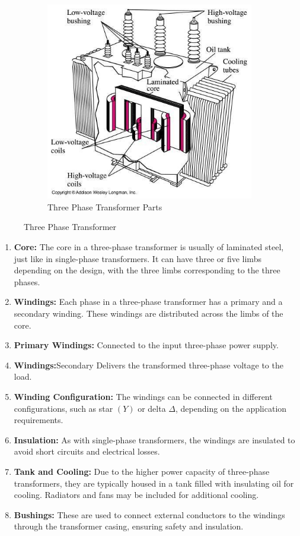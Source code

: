 \documentclass[a4paper,12pt]{article}
\begin{document}
\begin{figure}[h]
\begin{subfigure}[t]{0.49\textwidth}
			\includegraphics[width=1\textwidth, height=0.25\textheight]{Images/T3.2}
			\caption{Three Phase Transformer Parts}
			\label{fig:3-b}
		\end{subfigure}
		\caption{Three Phase Transformer}
		\label{fig:3}
	\end{figure}
	

	\begin{enumerate}
		\item \textbf{Core:}  The core in a three-phase transformer is usually of laminated steel, just like in single-phase transformers. It can have three or five limbs depending on the design, with the three limbs corresponding to the three phases.
	\item \textbf{	Windings:} Each phase in a three-phase transformer has a primary and a secondary winding. These windings are distributed across the limbs of the core.
	\item \textbf{	Primary Windings:} Connected to the input three-phase power supply.
		\item \textbf{Windings:}Secondary  Delivers the transformed three-phase voltage to the load.
	\item \textbf{Winding Configuration:}	 The windings can be connected in different configurations, such as star $(Y)$ or delta  $\Delta$, depending on the application requirements.
	\item \textbf{Insulation:}	 As with single-phase transformers, the windings are insulated to avoid short circuits and electrical losses.
	\item \textbf{Tank and Cooling:}	 Due to the higher power capacity of three-phase transformers, they are typically housed in a tank filled with insulating oil for cooling. Radiators and fans may be included for additional cooling.
	\item \textbf{Bushings: }	These are used to connect external conductors to the windings through the transformer casing, ensuring safety and insulation.
	\end{enumerate}
\end{document}
